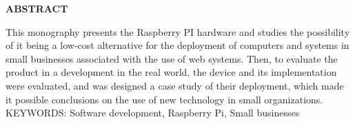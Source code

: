 \begin{center}
\textbf{ABSTRACT}
\end{center}

\singlespacing

\noindent This monography presents the Raspberry PI hardware and studies the possibility  of it being a low-cost alternative 
for the deployment of computers and systems in small businesses associated with the use of web systems. Then, to evaluate the product in a 
development in the real world, the device and its implementation were evaluated, and was designed a case study of their deployment, which made it possible 
conclusions on the use of new technology in small organizations. \\

\noindent KEYWORDS: Software development, Raspberry Pi, Small businesses